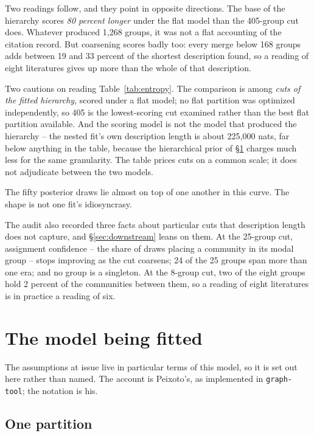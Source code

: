\documentclass[11pt]{article}
\newcommand{\code}[1]{\texttt{\small #1}}
\begin{document}
Two readings follow, and they point in opposite directions. The base of the
hierarchy scores \emph{80 percent longer} under the flat model than the
405-group cut does. Whatever produced 1{,}268 groups, it was not a flat
accounting of the citation record. But coarsening scores badly too: every merge below 168 groups adds between 19
and 33 percent of the shortest description found, so a reading of eight
literatures gives up more than the whole of that description.

Two cautions on reading Table~\ref{tab:entropy}. The comparison is among
\emph{cuts of the fitted hierarchy}, scored under a flat model; no flat
partition was optimized independently, so 405 is the lowest-scoring cut examined
rather than the best flat partition available. And the scoring model is not the
model that produced the hierarchy -- the nested fit's own description length is
about 225{,}000 nats, far below anything in the table, because the hierarchical
prior of \S\ref{sec:model} charges much less for the same granularity. The
table prices cuts on a common scale; it does not adjudicate between the two
models.

The fifty posterior draws lie almost on top of one another in this curve. The
shape is not one fit's idiosyncrasy.

The audit also recorded three facts about particular cuts that description
length does not capture, and \S\ref{sec:downstream} leans on them. At the
25-group cut, assignment confidence -- the share of draws placing a community
in its modal group -- stops improving as the cut coarsens; 24 of the 25 groups
span more than one era; and no group is a singleton. At the 8-group cut, two
of the eight groups hold 2 percent of the communities between them, so a
reading of eight literatures is in practice a reading of six.

\section{The model being fitted}
\label{sec:model}

The assumptions at issue live in particular terms of this model, so it is set
out here rather than named. The account is Peixoto's, as implemented in
\code{graph-tool}; the notation is his.

\subsection{One partition}
\end{document}
